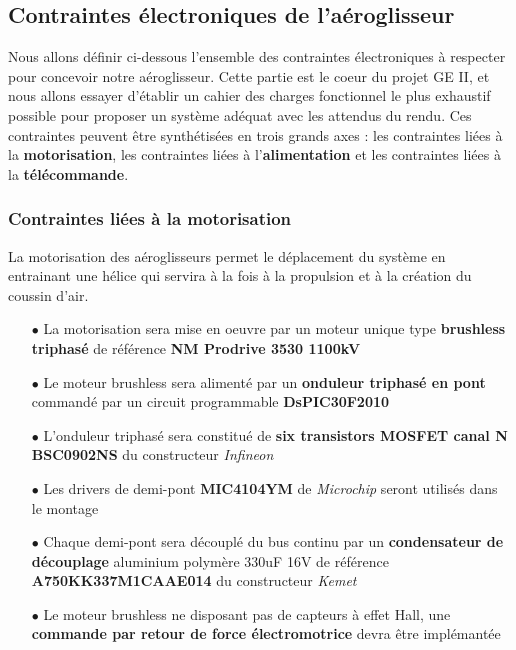 \documentclass[a4paper,12pt]{report}
\begin{document}
		\vspace{-1em}
		
		\subsection{Contraintes électroniques de l'aéroglisseur}
		
		\vspace{-1em}
		
		Nous allons définir ci-dessous l'ensemble des contraintes électroniques à respecter pour concevoir notre aéroglisseur. Cette partie est le coeur du projet GE II, et nous allons essayer d'établir un cahier des charges fonctionnel le plus exhaustif possible pour proposer un système adéquat avec les attendus du rendu. Ces contraintes peuvent être synthétisées en trois grands axes : les contraintes liées à la \textbf{motorisation}, les contraintes liées à l'\textbf{alimentation} et les contraintes liées à la \textbf{télécommande}.

		\vspace{-1em}		
		
			\subsubsection{Contraintes liées à la motorisation}
			
			\vspace{-1em}
			
			La motorisation des aéroglisseurs permet le déplacement du système en entrainant une hélice qui servira à la fois à la propulsion et à la création du coussin d'air. 
			
			\begin{itemize}
				\item[$\bullet$] La motorisation sera mise en oeuvre par un moteur unique type \textbf{brushless triphasé} de référence \textbf{NM Prodrive 3530 1100kV}
				\item[$\bullet$] Le moteur brushless sera alimenté par un \textbf{onduleur triphasé en pont} commandé par un circuit programmable \textbf{DsPIC30F2010}
				\item[$\bullet$] L'onduleur triphasé sera constitué de \textbf{six transistors MOSFET canal N} \textbf{BSC0902NS} du constructeur \textit{Infineon}
				\item[$\bullet$] Les drivers de demi-pont \textbf{MIC4104YM} de \textit{Microchip} seront utilisés dans le montage
				\item[$\bullet$] Chaque demi-pont sera découplé du bus continu par un \textbf{condensateur de découplage} aluminium polymère 330uF 16V de référence \textbf{A750KK337M1CAAE014} du constructeur \textit{Kemet}
				\item[$\bullet$] Le moteur brushless ne disposant pas de capteurs à effet Hall, une \textbf{commande par retour de force électromotrice} devra être implémantée
			\end{itemize}
			
\end{document}
